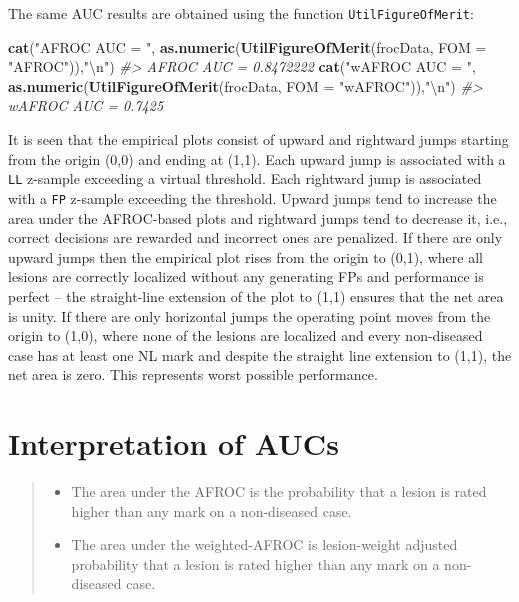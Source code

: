 \documentclass[
]{book}
\newenvironment{Shaded}{\begin{snugshade}}{\end{snugshade}}
\newcommand{\CharTok}[1]{\textcolor[rgb]{0.31,0.60,0.02}{#1}}
\newcommand{\CommentTok}[1]{\textcolor[rgb]{0.56,0.35,0.01}{\textit{#1}}}
\newcommand{\DataTypeTok}[1]{\textcolor[rgb]{0.13,0.29,0.53}{#1}}
\newcommand{\KeywordTok}[1]{\textcolor[rgb]{0.13,0.29,0.53}{\textbf{#1}}}
\newcommand{\NormalTok}[1]{#1}
\newcommand{\StringTok}[1]{\textcolor[rgb]{0.31,0.60,0.02}{#1}}
\providecommand{\tightlist}{%
  \setlength{\itemsep}{0pt}\setlength{\parskip}{0pt}}
\begin{document}
The same AUC results are obtained using the function \texttt{UtilFigureOfMerit}:

\begin{Shaded}
\begin{Highlighting}[]
\KeywordTok{cat}\NormalTok{(}\StringTok{"AFROC AUC = "}\NormalTok{, }
    \KeywordTok{as.numeric}\NormalTok{(}\KeywordTok{UtilFigureOfMerit}\NormalTok{(frocData, }\DataTypeTok{FOM =} \StringTok{"AFROC"}\NormalTok{)),}\StringTok{"}\CharTok{\textbackslash{}n}\StringTok{"}\NormalTok{)}
\CommentTok{#> AFROC AUC =  0.8472222}
\KeywordTok{cat}\NormalTok{(}\StringTok{"wAFROC AUC = "}\NormalTok{, }
    \KeywordTok{as.numeric}\NormalTok{(}\KeywordTok{UtilFigureOfMerit}\NormalTok{(frocData, }\DataTypeTok{FOM =} \StringTok{"wAFROC"}\NormalTok{)),}\StringTok{"}\CharTok{\textbackslash{}n}\StringTok{"}\NormalTok{)}
\CommentTok{#> wAFROC AUC =  0.7425}
\end{Highlighting}
\end{Shaded}

It is seen that the empirical plots consist of upward and rightward jumps starting from the origin (0,0) and ending at (1,1). Each upward jump is associated with a \texttt{LL} z-sample exceeding a virtual threshold. Each rightward jump is associated with a \texttt{FP} z-sample exceeding the threshold. Upward jumps tend to increase the area under the AFROC-based plots and rightward jumps tend to decrease it, i.e., correct decisions are rewarded and incorrect ones are penalized. If there are only upward jumps then the empirical plot rises from the origin to (0,1), where all lesions are correctly localized without any generating FPs and performance is perfect -- the straight-line extension of the plot to (1,1) ensures that the net area is unity. If there are only horizontal jumps the operating point moves from the origin to (1,0), where none of the lesions are localized and every non-diseased case has at least one NL mark and despite the straight line extension to (1,1), the net area is zero. This represents worst possible performance.

\hypertarget{empirical-meanings}{%
\section{Interpretation of AUCs}\label{empirical-meanings}}

\begin{quote}
\begin{itemize}
\tightlist
\item
  The area under the AFROC is the probability that a lesion is rated higher than any mark on a non-diseased case.
\item
  The area under the weighted-AFROC is lesion-weight adjusted probability that a lesion is rated higher than any mark on a non-diseased case.
\end{itemize}
\end{quote}
\end{document}
